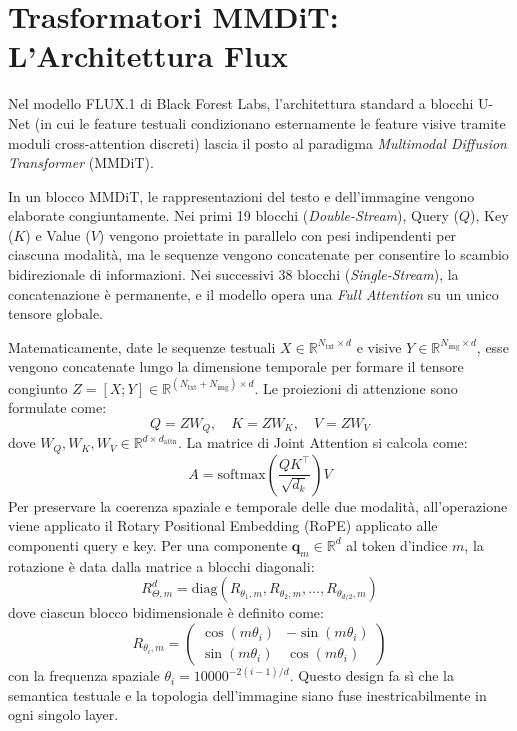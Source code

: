 \documentclass[12pt,a4paper]{report}
\begin{document}
\chapter{Trasformatori MMDiT: L'Architettura Flux}
Nel modello FLUX.1 di Black Forest Labs, l'architettura standard a blocchi U-Net (in cui le feature testuali condizionano esternamente le feature visive tramite moduli cross-attention discreti) lascia il posto al paradigma \textit{Multimodal Diffusion Transformer} (MMDiT). 

In un blocco MMDiT, le rappresentazioni del testo e dell'immagine vengono elaborate congiuntamente. Nei primi 19 blocchi (\textit{Double-Stream}), Query ($Q$), Key ($K$) e Value ($V$) vengono proiettate in parallelo con pesi indipendenti per ciascuna modalità, ma le sequenze vengono concatenate per consentire lo scambio bidirezionale di informazioni. Nei successivi 38 blocchi (\textit{Single-Stream}), la concatenazione è permanente, e il modello opera una \textit{Full Attention} su un unico tensore globale. 

Matematicamente, date le sequenze testuali $X \in \mathbb{R}^{N_{\text{txt}} \times d}$ e visive $Y \in \mathbb{R}^{N_{\text{img}} \times d}$, esse vengono concatenate lungo la dimensione temporale per formare il tensore congiunto $Z = [X; Y] \in \mathbb{R}^{(N_{\text{txt}} + N_{\text{img}}) \times d}$. Le proiezioni di attenzione sono formulate come:
\begin{equation}
    Q = Z W_Q, \quad K = Z W_K, \quad V = Z W_V
\end{equation}
dove $W_Q, W_K, W_V \in \mathbb{R}^{d \times d_{\text{attn}}}$. La matrice di Joint Attention si calcola come:
\begin{equation}
    A = \text{softmax}\left( \frac{Q K^\top}{\sqrt{d_k}} \right) V
\end{equation}
Per preservare la coerenza spaziale e temporale delle due modalità, all'operazione viene applicato il Rotary Positional Embedding (RoPE) \cite{su2024roformer} applicato alle componenti query e key. Per una componente $\mathbf{q}_m \in \mathbb{R}^d$ al token d'indice $m$, la rotazione è data dalla matrice a blocchi diagonali:
\begin{equation}
    R_{\Theta, m}^d = \text{diag}\left( R_{\theta_1, m}, R_{\theta_2, m}, \dots, R_{\theta_{d/2}, m} \right)
\end{equation}
dove ciascun blocco bidimensionale è definito come:
\begin{equation}
    R_{\theta_i, m} = \begin{pmatrix} \cos(m\theta_i) & -\sin(m\theta_i) \\ \sin(m\theta_i) & \cos(m\theta_i) \end{pmatrix}
\end{equation}
con la frequenza spaziale $\theta_i = 10000^{-2(i-1)/d}$. Questo design fa sì che la semantica testuale e la topologia dell'immagine siano fuse inestricabilmente in ogni singolo layer.
\end{document}
